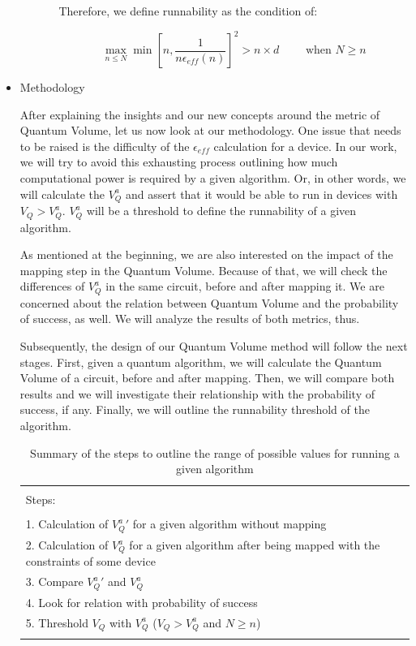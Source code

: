 \begin{itemize}
\begin{itemize}
\begin{itemize}
Therefore, we define runnability as the condition of:

$$\max_{n \le N} \min \left[ n,\frac{1}{n \epsilon_{eff} (n)}\right]^2 > n \times d \quad \quad \text{ when } N \ge n$$
\end{itemize}
\end{itemize}

\item Methodology
\label{sec:orgbb7af46}

After explaining the insights and our new concepts around the metric of Quantum Volume, let us now
look at our methodology.
One issue that needs to be raised is the difficulty of the \(\epsilon_{eff}\) calculation for a device.
In our work, we will try to avoid this exhausting process outlining how much computational power
is required by a given algorithm.
Or, in other words, we will calculate the \(V^a_Q\) and assert that it would be able to run in devices
with \(V_Q > V^a_Q\).
\(V^a_Q\) will be a threshold to define the runnability of a given algorithm.

As mentioned at the beginning, we are also interested on the impact of the mapping step in the
Quantum Volume.
Because of that, we will check the differences of \(V^a_Q\) in the same circuit, before and after
mapping it.
We are concerned about the relation between Quantum Volume and the probability of success, as
well.
We will analyze the results of both metrics, thus.

Subsequently, the design of our Quantum Volume method will follow the next stages.
First, given a quantum algorithm, we will calculate the Quantum Volume of a circuit, before and after mapping.
Then, we will compare both results and we will investigate their relationship with the probability
of success, if any.
Finally, we will outline the runnability threshold of the algorithm.

\begin{table}[htbp]
\caption{\label{tab:org80138d0}
Summary of the steps to outline the range of possible values for running a given algorithm}
\centering
\small
\begin{tabular}{|l|}
\hline
\\
Steps:\\
\\
1. Calculation of \(V^a_Q \prime\) for a given algorithm without mapping\\
2. Calculation of \(V^a_Q\) for a given algorithm after being mapped with the constraints of some device\\
3. Compare \(V^a_Q \prime\) and \(V^a_Q\)\\
4. Look for relation with probability of success\\
5. Threshold \(V_Q\) with \(V^a_Q\) (\(V_Q > V^a_Q\) and \(N \ge n\))\\
\\
\hline
\end{tabular}
\end{table}
\end{itemize}
